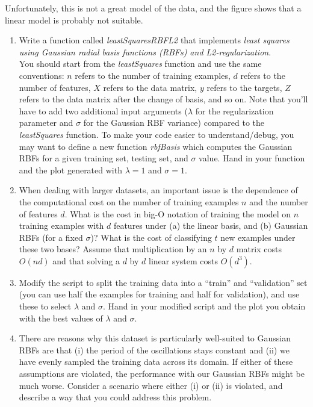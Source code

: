 \documentclass{article}
\def\blu#1{{\color{blu}#1}}
\def\enum#1{\begin{enumerate}#1\end{enumerate}}
\begin{document}
Unfortunately, this is not a great model of the data, and the figure shows that a linear model is probably not suitable.
\enum{
\item Write a function called \emph{leastSquaresRBFL2} that implements \emph{least squares using Gaussian radial basis functions (RBFs) and L2-regularization}. \\You should start from the \emph{leastSquares} function and use the same conventions: $n$ refers to the number of training examples, $d$ refers to the number of features, $X$ refers to the data matrix, $y$ refers to the targets, $Z$ refers to the data matrix after the change of basis, and so on. Note that you'll have to add two additional input arguments ($\lambda$ for the regularization parameter and $\sigma$ for the Gaussian RBF variance) compared to the \emph{leastSquares} function. To make your code easier to understand/debug, you may want to define a new function \emph{rbfBasis} which computes the Gaussian RBFs for a given training set, testing set, and $\sigma$ value. \blu{Hand in your function and the plot generated with $\lambda = 1$ and $\sigma = 1$.}
\item When dealing with larger datasets, an important issue is the dependence of the computational cost on the number of training examples $n$ and the number of features $d$. \blu{What is the cost in big-O notation of training the model on $n$ training examples with $d$ features under (a) the linear basis, and (b) Gaussian RBFs (for a fixed $\sigma$)? What is the cost of classifying $t$ new examples under these two bases? } Assume that multiplication by an $n$ by $d$ matrix costs $O(nd)$ and that solving a $d$ by $d$ linear system costs $O(d^3)$.
\item Modify the script to split the training data into a ``train'' and ``validation'' set (you can use half the examples for training and half for validation), and use these to select $\lambda$ and $\sigma$. \blu{Hand in your modified script and the plot you obtain with the best values of $\lambda$ and $\sigma$.}
\item There are reasons why this dataset is particularly well-suited to Gaussian RBFs are that (i) the period of the oscillations stays constant and (ii) we have evenly sampled the training data across its domain. If either of these assumptions are violated, the performance with our Gaussian RBFs might be much worse.
\blu{Consider a scenario where either (i) or (ii) is violated, and describe a way that you could address this problem.}
}
\end{document}
